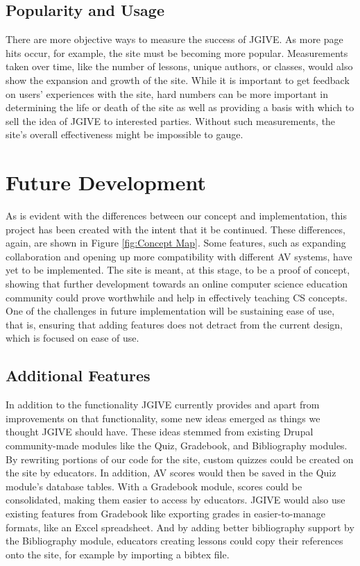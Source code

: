 \documentclass{acm_proc_article-sp}
\begin{document}
\subsection{Popularity and Usage}
There are more objective ways to measure the success of JGIVE. As more page hits occur, for example, the site must be becoming more popular. Measurements taken over time, like the number of lessons, unique authors, or classes, would also show the expansion and growth of the site. While it is important to get feedback on users' experiences with the site, hard numbers can be more important in determining the life or death of the site as well as providing a basis with which to sell the idea of JGIVE to interested parties. Without such measurements, the site's overall effectiveness might be impossible to gauge.

\section{Future Development}
\label{Future Development}
As is evident with the differences between our concept and implementation, this project has been created with the intent that it be continued. These differences, again, are shown in Figure \ref{fig:Concept Map}. Some features, such as expanding collaboration and opening up more compatibility with different AV systems, have yet to be implemented. The site is meant, at this stage, to be a proof of concept, showing that further development towards an online computer science education community could prove worthwhile and help in effectively teaching CS concepts. One of the challenges in future implementation will be sustaining ease of use, that is, ensuring that adding features does not detract from the current design, which is focused on ease of use.

\subsection{Additional Features}
In addition to the functionality JGIVE currently provides and apart from improvements on that functionality, some new ideas emerged as things we thought JGIVE should have. These ideas stemmed from existing Drupal community-made modules like the Quiz, Gradebook, and Bibliography modules. By rewriting portions of our code for the site, custom quizzes could be created on the site by educators. In addition, AV scores would then be saved in the Quiz module's database tables. With a Gradebook module, scores could be consolidated, making them easier to access by educators. JGIVE would also use existing features from Gradebook like exporting grades in easier-to-manage formats, like an Excel spreadsheet. And by adding better bibliography support by the Bibliography module, educators creating lessons could copy their references onto the site, for example by importing a bibtex file.
\end{document}
